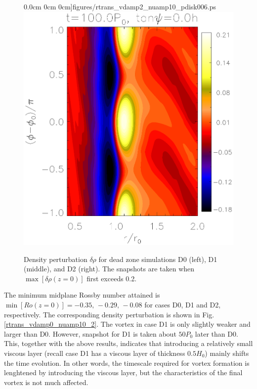 \begin{figure}
     0.0cm 0cm
     0cm]{figures/rtrans_vdamp2_nuamp10_pdisk006.ps}\includegraphics[scale=.27,clip=true,clip=true,trim=2.3cm
     0.0cm 0cm
     0cm]{figures/rtrans_vdamp3_nuamp10_pdisk010.ps}%
   \caption{Density perturbation $\delta\rho$ for dead zone simulations
     D0 (left), D1 (middle), and D2 (right). The snapshots are
     taken when $\max[\delta\rho(z=0)]$ first exceeds 0.2. 
     \label{rtrans_vdamp0_nuamp10}}
\end{figure}


The minimum midplane Rossby number attained is
$\min[Ro(z=0)]=-0.35,\,-0.29,\,-0.08$ for cases D0, D1 and D2,
respectively. The corresponding density perturbation is shown in
Fig. \ref{rtrans_vdamp0_nuamp10_2}. The vortex in case D1 is only slightly
weaker and larger than D0. However, snapshot for D1 is taken about
$50P_0$ later than D0. This, together with the above results,
indicates that introducing a relatively small viscous layer (recall
case D1 has a viscous layer of thickness $0.5H_0$) mainly shifts the
time evolution. In other words, the timescale required for vortex
formation is lenghtened by introducing the viscous layer, but the
characteristics of the final vortex is not much affected. 

